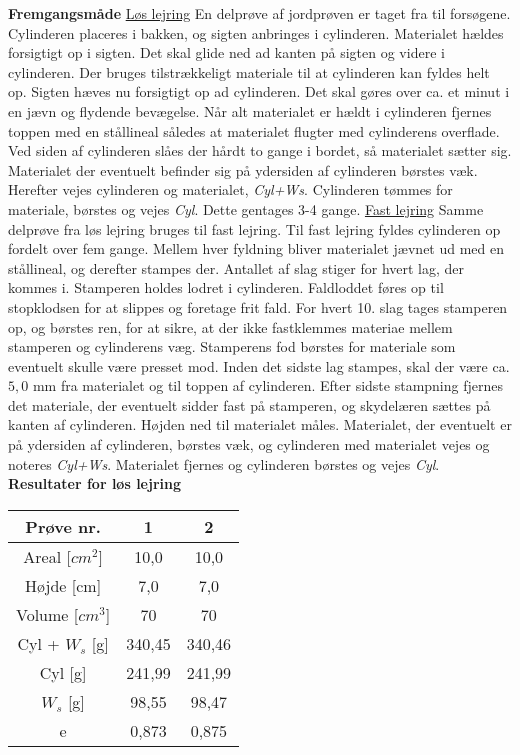\textbf{Fremgangsmåde}
\newline
\underline{Løs lejring}
\newline
En delprøve af jordprøven er taget fra til forsøgene. Cylinderen placeres i bakken, og sigten anbringes i cylinderen. Materialet hældes forsigtigt op i sigten. Det skal glide ned ad kanten på sigten og videre i cylinderen. Der bruges tilstrækkeligt materiale til at cylinderen kan fyldes helt op. Sigten hæves nu forsigtigt op ad cylinderen. Det skal gøres over ca. et minut  i en jævn og flydende bevægelse. Når alt materialet er hældt i cylinderen fjernes toppen med en stållineal således at materialet flugter med cylinderens overflade. Ved siden af cylinderen slåes der hårdt to gange i bordet, så materialet sætter sig. Materialet der eventuelt befinder sig på ydersiden af cylinderen børstes væk. Herefter vejes cylinderen og materialet, \textit{Cyl+Ws}. Cylinderen tømmes for materiale, børstes og vejes \textit{Cyl}. Dette gentages 3-4 gange.
\newline
\newline
\underline{Fast lejring}
\newline
Samme delprøve fra løs lejring bruges til fast lejring. Til fast lejring fyldes cylinderen op fordelt over fem gange. Mellem hver fyldning bliver materialet jævnet ud med en stållineal, og derefter stampes der. Antallet af slag stiger for hvert lag, der kommes i. Stamperen holdes lodret i cylinderen. Faldloddet føres op til stopklodsen for at slippes og foretage frit fald. For hvert 10. slag tages stamperen op, og børstes ren, for at sikre, at der ikke fastklemmes materiae mellem stamperen og cylinderens væg. Stamperens fod børstes for materiale som eventuelt skulle være presset mod. Inden det sidste lag stampes, skal der være ca. $5,\!0$ mm fra materialet og til toppen af cylinderen. Efter sidste stampning fjernes det materiale, der eventuelt sidder fast på stamperen, og skydelæren sættes på kanten af cylinderen. Højden ned til materialet måles. Materialet, der eventuelt er på ydersiden af cylinderen, børstes væk, og cylinderen med materialet vejes og noteres \textit{Cyl+Ws}. Materialet fjernes og cylinderen børstes og vejes \textit{Cyl}.
\newline
\newline
\textbf{Resultater for løs lejring}
\begin{center}
	\begin{tabular}{ |c|c|c| } 
		\hline
		Prøve nr. & 1 & 2 \\	\hline 
		Areal [$cm^2$] & 10,0 & 10,0 \\ \hline
		Højde [cm] & 7,0 & 7,0 \\ \hline
		Volume [$cm^3$] & 70 & 70 \\ \hline
		Cyl + $W_s$ [g] & 340,45 & 340,46 \\ \hline
		Cyl [g] & 241,99 & 241,99 \\ \hline
		$W_s$ [g] & 98,55 & 98,47 \\ \hline
		e & 0,873 & 0,875 \\ \hline
	\end{tabular}
\end{center}

